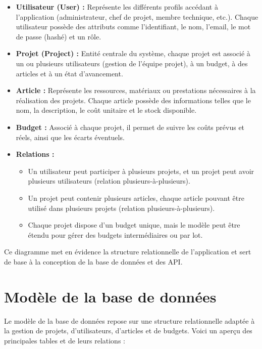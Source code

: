 \documentclass[12pt,a4paper]{report}
\begin{document}
\begin{itemize}
    \item \textbf{Utilisateur (User) :} Représente les différents profils accédant à l’application (administrateur, chef de projet, membre technique, etc.). Chaque utilisateur possède des attributs comme l’identifiant, le nom, l’email, le mot de passe (hashé) et un rôle.
    \item \textbf{Projet (Project) :} Entité centrale du système, chaque projet est associé à un ou plusieurs utilisateurs (gestion de l’équipe projet), à un budget, à des articles et à un état d’avancement.
    \item \textbf{Article :} Représente les ressources, matériaux ou prestations nécessaires à la réalisation des projets. Chaque article possède des informations telles que le nom, la description, le coût unitaire et le stock disponible.
    \item \textbf{Budget :} Associé à chaque projet, il permet de suivre les coûts prévus et réels, ainsi que les écarts éventuels.
    \item \textbf{Relations :} 
    \begin{itemize}
        \item Un utilisateur peut participer à plusieurs projets, et un projet peut avoir plusieurs utilisateurs (relation plusieurs-à-plusieurs).
        \item Un projet peut contenir plusieurs articles, chaque article pouvant être utilisé dans plusieurs projets (relation plusieurs-à-plusieurs).
        \item Chaque projet dispose d’un budget unique, mais le modèle peut être étendu pour gérer des budgets intermédiaires ou par lot.
    \end{itemize}
\end{itemize}

Ce diagramme met en évidence la structure relationnelle de l’application et sert de base à la conception de la base de données et des API.
\section{Modèle de la base de données}

Le modèle de la base de données repose sur une structure relationnelle adaptée à la gestion de projets, d’utilisateurs, d’articles et de budgets. Voici un aperçu des principales tables et de leurs relations :
\end{document}
